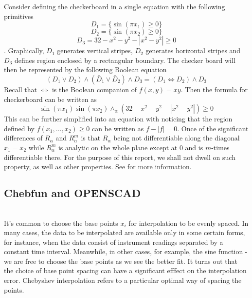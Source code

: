 \documentclass[12pt]{amsart}
\theoremstyle{definition}
\begin{document}
Consider defining the checkerboard in a single equation with the following primitives 
$$D_1=\{\sin(\pi x_1)\geq 0\}$$
$$D_2=\{\sin(\pi x_2)\geq 0\}$$
$$D_3=32-x^2-y^2-|x^2-y^2|\geq 0$$. 
Graphically, $D_1$ generates vertical stripes, $D_2$ generates horizontal stripes and $D_3$ defines region enclosed by a rectangular boundary. The checker board will then be represented by the following Boolean equation
$$(D_1\vee D_2)\wedge (\bar{D}_1\vee \bar{D}_2)\wedge D_3=(D_1\Leftrightarrow D_2)\wedge D_3$$
Recall that $\Leftrightarrow$ is the Boolean companion of $f(x,y)=xy$. Then the formula for checkerboard can be written as 
$$\sin(\pi x_1)\sin(\pi x_2) \wedge_\alpha (32-x^2-y^2-|x^2-y^2|) \geq 0$$
This can be further simplified into an equation with noticing that the region defined by $f(x_1,...,x_2)\geq 0$ can be written as $f-|f|= 0$. Once of the significant differences of $R_\alpha$ and $R_{\alpha}^{m}$ is that $R_\alpha$ being not differentiable along the diagonal $x_1=x_2$ while $R_{\alpha}^m$ is analytic on the whole plane except at $0$ and is $m$-times differentiable there. For the purpose of this report, we shall not dwell on such property, as well as other properties. See for more information. 
\subsection{Chebfun and OPENSCAD}~\\
It's common to choose the base points $x_i$ for interpolation to be evenly spaced. In many cases, the data to be interpolated are available only in some certain forms, for instance, when the data consist of instrument readings separated by a constant time interval. Meanwhile, in other cases, for example, the sine function - we are free to choose the base points as we see the better fit. It turns out that the choice of base point spacing can have a significant efffect on the interpolation error. Chebyshev interpolation refers to a particular optimal way of spacing the points.\\ 
\end{document}
